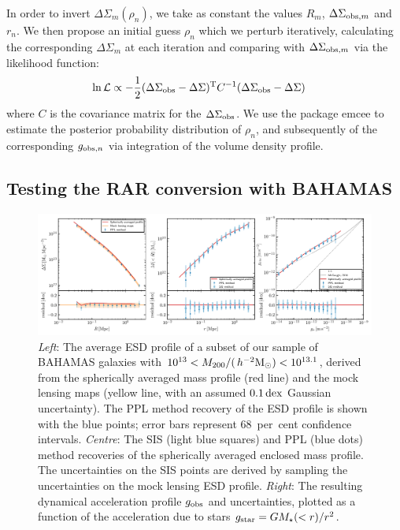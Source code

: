 \documentclass[usenatbib]{mnras}
\newcommand{\hmsun}{\,h^{-2} {\rm M_\odot}}
\newcommand{\un}[1]{_{\rm #1}}
\newcommand{\dex}{\, {\rm dex}}
\begin{document}
In order to invert $\Delta\Sigma_m(\rho_n)$, we take as constant the values $R_m$, $\Delta\Sigma_{{\rm obs},m}$ and $r_{n}$. We then propose an initial guess $\rho_n$ which we perturb iteratively, calculating the corresponding $\Delta\Sigma_m$ at each iteration and comparing with $\Delta\Sigma_{{\rm obs},m}$ via the likelihood function:
\begin{align}
	\ln\mathcal{L} &\propto -\frac{1}{2}(\Delta\Sigma\un{obs}-\Delta\Sigma)^{\rm T}C^{-1}(\Delta\Sigma\un{obs}-\Delta\Sigma)
\end{align}
where $C$ is the covariance matrix for the $\Delta\Sigma\un{obs}$. We use the package {\sc emcee} \citep{foreman-mackey13} to estimate the posterior probability distribution of $\rho_n$, and subsequently of the corresponding $g_{{\rm obs},n}$ via integration of the volume density profile.


\subsection{Testing the RAR conversion with BAHAMAS}
\label{sec:conversion_test}

\begin{figure}
	\includegraphics[width=\textwidth]{Figures/compare_method}
	\caption{\emph{Left}: The average ESD profile of a subset of our sample of BAHAMAS galaxies with $10^{13}<M_{200}/(\hmsun)<10^{13.1}$, derived from the spherically averaged mass profile (red line) and the mock lensing maps (yellow line, with an assumed $0.1 \dex$ Gaussian uncertainty). The PPL method recovery of the ESD profile is shown with the blue points; error bars represent 68~per~cent confidence intervals. \emph{Centre}: The SIS (light blue squares) and PPL (blue dots) method recoveries of the spherically averaged enclosed mass profile. The uncertainties on the SIS points are derived by sampling the uncertainties on the mock lensing ESD profile. \emph{Right}: The resulting dynamical acceleration profile $g_{\rm obs}$ and uncertainties, plotted as a function of the acceleration due to stars $g_{\rm star}=GM_\star(<r)/r^2$.}
	\label{fig:compare_method}
\end{figure}
\end{document}
